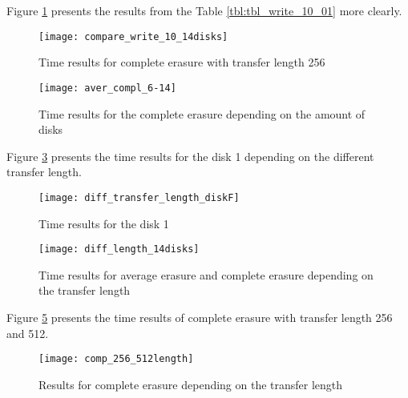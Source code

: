 \newpage
Figure \ref{fig:compare_write_10_14disks} presents the results from the Table \ref{tbl:tbl_write_10_01} more clearly.

\begin{figure}[h!]
\begin{center}
  \texttt{[image: compare\_write\_10\_14disks]}
\end{center}
  \caption{Time results for complete erasure with transfer length 256}
  \label{fig:compare_write_10_14disks}
\end{figure}


\begin{figure}[h!]
\begin{center}
  \texttt{[image: aver\_compl\_6-14]}
\end{center}
  \caption{Time results for the complete erasure depending on the amount of disks}
  \label{fig:aver_compl_6-14}
\end{figure}

\newpage
Figure \ref{fig:diff_transfer_length_diskF} presents the time results for the disk 1 depending on the different transfer length.

\begin{figure}[h!]
\begin{center}
  \texttt{[image: diff\_transfer\_length\_diskF]}
\end{center}
  \caption{Time results for the disk 1}
  \label{fig:diff_transfer_length_diskF}
\end{figure}


\begin{figure}[h!]
\begin{center}
  \texttt{[image: diff\_length\_14disks]}
\end{center}
  \caption{Time results for average erasure and complete erasure depending on the transfer length}
  \label{fig:diff_length_14disks}
\end{figure}


\newpage
Figure \ref{fig:comp_256_512length} presents the time results of complete erasure with transfer length 256 and 512.
\begin{figure}[h!]
\begin{center}
  \texttt{[image: comp\_256\_512length]}
\end{center}
  \caption{Results for complete erasure depending on the transfer length}
  \label{fig:comp_256_512length}
\end{figure}

